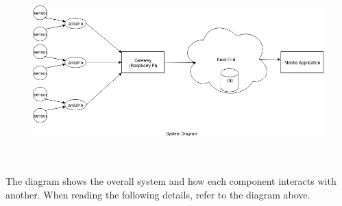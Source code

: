 
\begin{figure}[h]
	\centering
	\includegraphics[width=15cm, height=7cm]{Diagrams/Overview.png}
\end{figure}

The diagram shows the overall system and how each component interacts with another. When reading the following details, refer to the diagram above. 